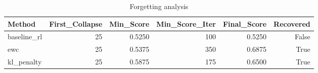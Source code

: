 \begin{table}[htbp]
\centering
\caption{Forgetting analysis}
\label{tab:forgetting}
\begin{tabular}{lrrrrr}
\toprule
\textbf{Method} & \textbf{First\_Collapse} & \textbf{Min\_Score} & \textbf{Min\_Score\_Iter} & \textbf{Final\_Score} & \textbf{Recovered} \\
\midrule
baseline\_rl & 25 & 0.5250 & 100 & 0.5250 & False \\
ewc & 25 & 0.5375 & 350 & 0.6875 & True \\
kl\_penalty & 25 & 0.5875 & 175 & 0.6500 & True \\
\bottomrule
\end{tabular}
\end{table}